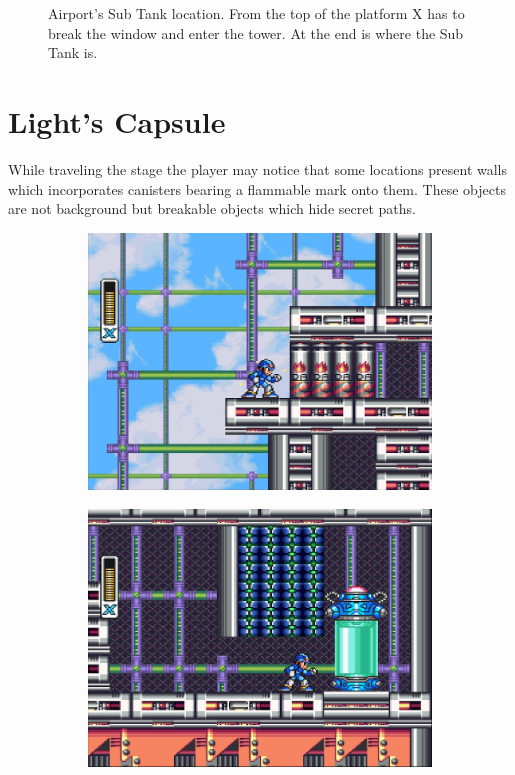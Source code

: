 \begin{figure}[htp]
\begin{subfigure}{0.4\linewidth}
		\caption{}
	\end{subfigure}
	\caption{Airport's Sub Tank location. From the top of the platform X has to break the window and enter the tower. At the end is where the Sub Tank is.}
\end{figure}

\section{Light's Capsule} 

While traveling the stage the player may notice that some locations present walls which incorporates canisters bearing a flammable mark onto them. These objects are not background but breakable objects which hide secret paths. 
\begin{figure}[htp]
	\centering
	\begin{subfigure}{0.4\linewidth}
		\centering
		\includegraphics[width=\linewidth]{figures/X1/Storm_eagle/Storm_armor_1.jpg}
		\caption{}
	\end{subfigure}
	\begin{subfigure}{0.4\linewidth}
		\centering
		\includegraphics[width=\linewidth]{figures/X1/Storm_eagle/Storm_armor_2.jpg}

\end{subfigure}
\end{figure}
